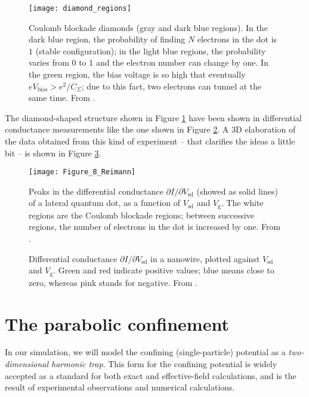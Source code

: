 \begin{figure}[h]%
	\centering
	\texttt{[image: diamond\_regions]}
	\caption{Coulomb blockade diamonds (gray and dark blue regions). In the dark blue region, the probability of finding $N$ electrons in the dot is $1$ (stable configuration); in the light blue regions, the probability varies from 0 to 1 and the electron number can change by one. In the green region, the bias voltage is so high that eventually $eV_{\text{bias}} > e^2/C_{\Sigma}$; due to this fact, two electrons can tunnel at the same time. From \cite{Fasth2007}.}
	\label{fig:diamond_regions}
\end{figure}

The diamond-shaped structure shown in Figure \ref{fig:diamond_regions} have been shown in differential conductance measurements like the one shown in Figure \ref{fig:Figure_8_Reimann}. A 3D elaboration of the data obtained from this kind of experiment -- that clarifies the ideas a little bit -- is shown in Figure \ref{fig:diff_conductance_3D}.

\begin{figure}[H]
	\centering
	\texttt{[image: Figure\_8\_Reimann]}
	\caption{Peaks in the differential conductance $\partial I/\partial V_{\text{sd}}$ (showed as solid lines) of a lateral quantum dot, as a function of $V_{\text{sd}}$ and $V_{\text{g}}$. The white regions are the Coulomb blockade regions; between successive regions, the number of electrons in the dot is increased by one. From \cite{Reimann2002}.}
	\label{fig:Figure_8_Reimann}
\end{figure}

\begin{figure}[H]
	\centering
	\def\svgwidth{0.8\textwidth}
	
	\caption{Differential conductance $\partial I/\partial V_{\text{sd}}$ in a nanowire, plotted against $V_{\text{sd}}$ and $V_{\text{g}}$. Green and red indicate positive values; blue means close to zero, whereas pink stands for negative. From \cite{Weinmann1994}.}
	\label{fig:diff_conductance_3D}
\end{figure}

\section{The parabolic confinement}
In our simulation, we will model the confining (single-particle) potential as a \emph{two-dimensional harmonic trap}. This form for the confining potential is widely accepted as a standard for both exact and effective-field calculations, and is the result of experimental observations and numerical calculations.

